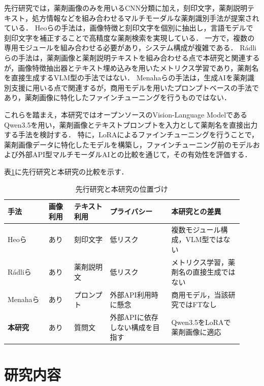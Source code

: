 \documentclass{ltjsarticle}
\begin{document}
先行研究では，薬剤画像のみを用いるCNN分類に加え，刻印文字，薬剤説明テキスト，処方情報などを組み合わせるマルチモーダルな薬剤識別手法が提案されている．
Heoらの手法は，画像特徴と刻印文字を個別に抽出し，言語モデルで刻印文字を補正することで高精度な薬剤検索を実現している．
一方で，複数の専用モジュールを組み合わせる必要があり，システム構成が複雑である．
Rádliらの手法は，薬剤画像と薬剤説明テキストを組み合わせる点で本研究と関連するが，画像特徴抽出器とテキスト埋め込みを用いたメトリクス学習であり，薬剤名を直接生成するVLM型の手法ではない．
Menahaらの手法は，生成AIを薬剤識別支援に用いる点で関連するが，商用モデルを用いたプロンプトベースの手法であり，薬剤画像に特化したファインチューニングを行うものではない．

これらを踏まえ，本研究ではオープンソースのVision-Language ModelであるQwen3.5を用い，薬剤画像とテキストプロンプトを入力として薬剤名を直接出力する手法を検討する．
特に，LoRAによるファインチューニングを行うことで，薬剤画像データに特化したモデルを構築し，ファインチューニング前のモデルおよび外部API型マルチモーダルAIとの比較を通じて，その有効性を評価する．

表\ref{tab:related}に先行研究と本研究の比較を示す．

\begin{table}[h]
\centering
\caption{先行研究と本研究の位置づけ}
\label{tab:related}
\small
\setlength{\tabcolsep}{3pt}
\begin{tabular}{p{0.16\linewidth}p{0.10\linewidth}p{0.14\linewidth}p{0.24\linewidth}p{0.28\linewidth}}
\hline
手法 & 画像利用 & テキスト利用 & プライバシー & 本研究との差異 \\
\hline
Heoら \cite{heo2023pill}     & あり & 刻印文字 & 低リスク & 複数モジュール構成，VLM型ではない \\
Rádliら \cite{radli2024metric} & あり & 薬剤説明文 & 低リスク & メトリクス学習，薬剤名の直接生成ではない \\
Menahaら \cite{gemini2024pill} & あり & プロンプト & 外部API利用時に懸念 & 商用モデル，当該研究ではFTなし \\
\textbf{本研究}               & あり & 質問文 & 外部APIに依存しない構成を目指す & Qwen3.5をLoRAで薬剤画像に適応 \\
\hline
\end{tabular}
\end{table}

\newpage

\section{研究内容}\label{sec3}
\end{document}
